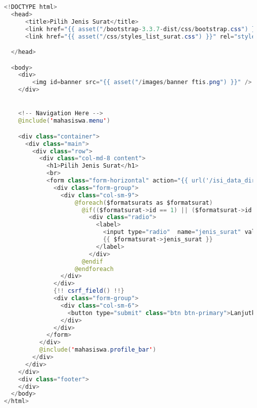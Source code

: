 \begin{lstlisting}[language=Java,basicstyle=\tiny,caption=Pilih jenis surat keterangan]
	<!DOCTYPE html>
  <head>
      <title>Pilih Jenis Surat</title>
      <link href="{{ asset("/bootstrap-3.3.7-dist/css/bootstrap.css") }}" rel="stylesheet" type="text/css" />
      <link href="{{ asset("/css/styles_list_surat.css") }}" rel="stylesheet" type="text/css">

  </head>

  <body>
    <div>
        <img id=banner src="{{ asset("/images/banner ftis.png") }}" />
    </div>


    <!-- Navigation Here -->
    @include('mahasiswa.menu')

    <div class="container">
      <div class="main">
        <div class="row">
          <div class="col-md-8 content">
            <h1>Pilih Jenis Surat</h1>
            <br>
            <form class="form-horizontal" action="{{ url('/isi_data_diri') }}" method="post">
              <div class="form-group">
                <div class="col-sm-9">
                    @foreach($formatsurats as $formatsurat)
                      @if(($formatsurat->id == 1) || ($formatsurat->id == 2))
                        <div class="radio">
                          <label>
                            <input type="radio"  name="jenis_surat" value="{{ $formatsurat->id }}" required>
                            {{ $formatsurat->jenis_surat }}
                          </label>
                        </div>
                      @endif
                    @endforeach
                </div>
              </div>
              {!! csrf_field() !!}
              <div class="form-group">
                <div class="col-sm-6">
                  <button type="submit" class="btn btn-primary">Lanjutkan</button>
                </div>
              </div>
            </form>
          </div>
          @include('mahasiswa.profile_bar')
        </div>
      </div>
    </div>
    <div class="footer">
    </div>
  </body>
</html>

\end{lstlisting}

